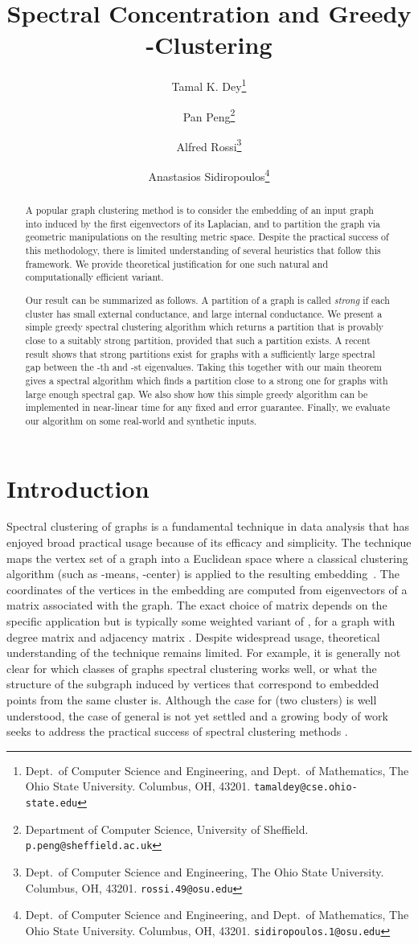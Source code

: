 \documentclass[11pt]{article}
\title{Spectral Concentration and Greedy -Clustering}
\author{
Tamal K. Dey\thanks{
    Dept.~of Computer Science and Engineering, and Dept.~of Mathematics, The Ohio State University. Columbus, OH, 43201.
    \texttt{tamaldey@cse.ohio-state.edu}
}
\and
Pan Peng\thanks{
    Department of Computer Science, University of Sheffield.
    \texttt{p.peng@sheffield.ac.uk}
}
\and
Alfred Rossi\thanks{
    Dept.~of Computer Science and Engineering, The Ohio State University. Columbus, OH, 43201.
    \texttt{rossi.49@osu.edu}
}
\and
Anastasios Sidiropoulos\thanks{
    Dept.~of Computer Science and Engineering, and Dept.~of Mathematics, The Ohio State University. Columbus, OH, 43201.
    \texttt{sidiropoulos.1@osu.edu}
}
}
\date{}
\theoremstyle{plain}
\begin{document}
\maketitle

\begin{abstract}
A popular graph clustering method is to consider the embedding of an input graph
 into  induced by the first  eigenvectors of its Laplacian, and
to partition the graph via geometric manipulations on the resulting metric
space. Despite the practical success of this methodology, there is limited
understanding of several heuristics that follow this framework. We provide
theoretical justification for one such natural and computationally efficient
variant.

Our result can be summarized as follows. A partition of a graph is called {\em
strong} if each cluster has small external conductance, and large internal
conductance. We present a simple greedy spectral clustering algorithm which
returns a partition that is provably close to a suitably strong partition,
provided that such a partition exists. A recent result shows that strong
partitions exist for graphs with a sufficiently large spectral gap between the
-th and -st eigenvalues. Taking this together with our main theorem
gives a spectral algorithm which finds a partition close to a strong one for
graphs with large enough spectral gap. We also show how this simple greedy
algorithm can be implemented in near-linear time for any fixed  and error
guarantee. Finally, we evaluate our algorithm on some real-world and synthetic
inputs.
\end{abstract}



 \section{Introduction}
Spectral clustering of graphs is a fundamental technique in data analysis that
has enjoyed broad practical usage because of its efficacy and simplicity. The
technique maps the vertex set of a graph into a Euclidean space 
 where a classical clustering algorithm (such as -means, -center) is
applied to the resulting embedding~\cite{DBLP:journals/sac/Luxburg07}. The
coordinates of the vertices in the embedding are computed from  eigenvectors
of a matrix associated with the graph. The exact choice of matrix depends on the
specific application but is typically some weighted variant of , for a
 graph with degree matrix  and adjacency matrix . Despite widespread usage, theoretical
understanding of the technique remains limited. For example, it is generally not
clear for which classes of graphs spectral clustering works well, or what the
structure of the subgraph induced by vertices that correspond to embedded points
from the same cluster is. Although the case for  (two clusters) is well
understood, the case of general  is not yet settled and a growing body of
work seeks to address the practical success of spectral clustering methods
\cite{DBLP:conf/nips/BalakrishnanXKS11,DBLP:journals/jacm/BiswalLR10,
DBLP:journals/siamcomp/Kelner06, DBLP:conf/nips/NgJW01,
DBLP:conf/compgeom/SpielmanT96, DBLP:journals/sac/Luxburg07}.
 
\end{document}

